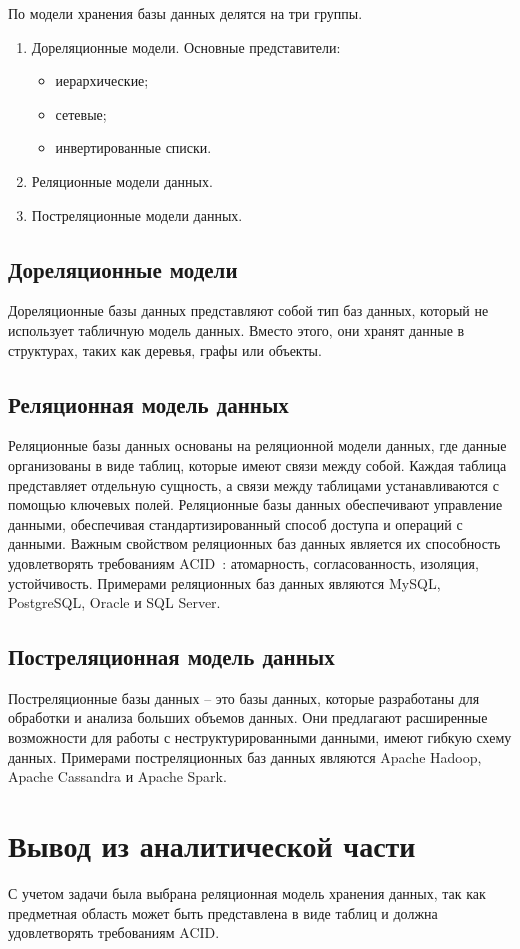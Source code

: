 По модели хранения базы данных делятся на три группы.
\begin{enumerate}
    \item Дореляционные модели. Основные представители:
    \begin{itemize}
        \item иерархические;
        \item сетевые;
        \item инвертированные списки.
    \end{itemize}
    \item Реляционные модели данных.
    \item Постреляционные модели данных.
\end{enumerate}

\subsection*{Дореляционные модели}
Дореляционные базы данных представляют собой тип баз данных, который не использует табличную модель данных. Вместо этого, они хранят данные в структурах, таких как деревья, графы или объекты. 

\subsection*{Реляционная модель данных}
Реляционные базы данных основаны на реляционной модели данных, где данные организованы в виде таблиц, которые имеют связи между собой. Каждая таблица представляет отдельную сущность, а связи между таблицами устанавливаются с помощью ключевых полей. Реляционные базы данных обеспечивают управление данными, обеспечивая стандартизированный способ доступа и операций с данными. Важным свойством реляционных баз данных является их способность удовлетворять требованиям ACID~\cite{acid}: атомарность, согласованность, изоляция, устойчивость. Примерами реляционных баз данных являются MySQL, PostgreSQL, Oracle и SQL Server.

\subsection*{Постреляционная модель данных}
Постреляционные базы данных -- это базы данных, которые разработаны для обработки и анализа больших объемов данных. Они предлагают расширенные возможности для работы с неструктурированными данными, имеют гибкую схему данных. Примерами постреляционных баз данных являются Apache Hadoop, Apache Cassandra и Apache Spark.

\section{Вывод из аналитической части}
С учетом задачи была выбрана реляционная модель хранения данных, так как предметная область может быть представлена в виде таблиц и должна удовлетворять требованиям ACID.
